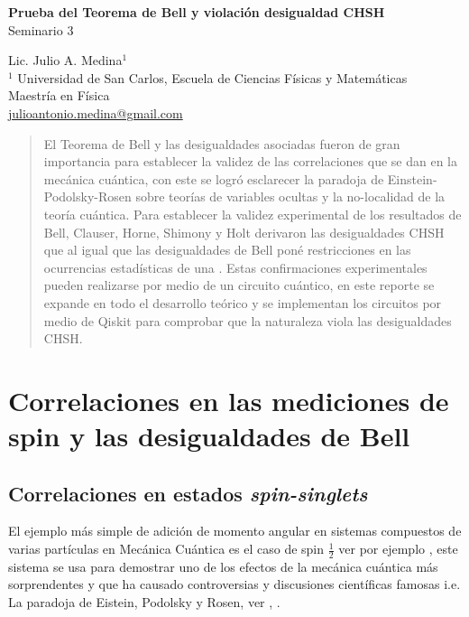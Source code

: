 \documentclass[a4paper]{article}
\begin{document}

\Large
 \begin{center}
\textbf{Prueba del Teorema de Bell y violación desigualdad CHSH}\\
Seminario 3  

\hspace{10pt}

\large
Lic. Julio A. Medina$^1$ \\

\hspace{10pt}
\small  
$^1$ Universidad de San Carlos, Escuela de Ciencias Físicas y Matemáticas\\
Maestría en Física\\
\href{mailto:julioantonio.medina@gmail.com}{julioantonio.medina@gmail.com}\\

\end{center}

\hspace{10pt}


\normalsize

\begin{abstract}
El Teorema de Bell y las desigualdades asociadas fueron de gran importancia para establecer la validez de las correlaciones que se dan en la mecánica cuántica, con este se logró esclarecer la paradoja de Einstein-Podolsky-Rosen sobre teorías de variables ocultas y la no-localidad de la teoría cuántica. Para establecer la validez experimental de los resultados de Bell, Clauser, Horne, Shimony y Holt derivaron las desigualdades CHSH que al igual que las desigualdades de Bell poné restricciones en las ocurrencias estadísticas de una . Estas confirmaciones experimentales pueden realizarse por medio de un circuito cuántico, en este reporte se expande en todo el desarrollo teórico y se implementan los circuitos por medio de Qiskit para comprobar que la naturaleza viola las desigualdades CHSH.
\end{abstract}

\section{Correlaciones en las mediciones de spin y las desigualdades de Bell}
\subsection{Correlaciones en estados \textit{spin-singlets}}
El ejemplo más simple de adición de momento angular en sistemas compuestos de varias partículas en Mecánica Cuántica es el caso de spin $\frac{1}{2}$ ver por ejemplo \cite{Sakurai}, este sistema se usa para demostrar uno de los efectos de la mecánica cuántica más sorprendentes y que ha causado controversias y discusiones científicas famosas i.e. La paradoja de Eistein, Podolsky y Rosen, ver \cite{Einstein}, \cite{Bell}.\\
\end{document}
